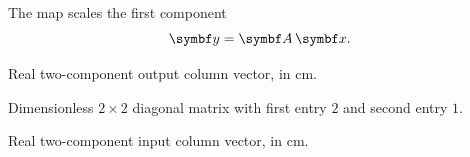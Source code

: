 \begin{frame}{The map scales the first component}
  \begin{equation}
    \nerudavector{y} = \nerudamatrix{A}\,\nerudavector{x}.
    \label{eq:scaling}
  \end{equation}
  \begin{description}[$\nerudamatrix{A}$]
    \item[$\nerudavector{y}$] Real two-component output column vector, in cm.
    \item[$\nerudamatrix{A}$] Dimensionless \(2\times2\) diagonal matrix
      with first entry \(2\) and second entry \(1\).
    \item[$\nerudavector{x}$] Real two-component input column vector, in cm.
  \end{description}
\end{frame}

